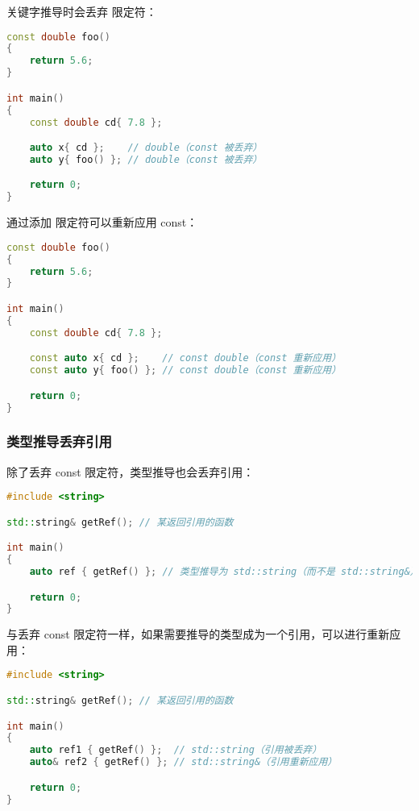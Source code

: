 \documentclass[../../LearnCpp.tex]{subfiles}
\begin{document}

 关键字推导时会丢弃  限定符：

\begin{lstlisting}[language=C++]
const double foo()
{
    return 5.6;
}

int main()
{
    const double cd{ 7.8 };

    auto x{ cd };    // double（const 被丢弃）
    auto y{ foo() }; // double（const 被丢弃）

    return 0;
}
\end{lstlisting}

通过添加  限定符可以重新应用 const：

\begin{lstlisting}[language=C++]
const double foo()
{
    return 5.6;
}

int main()
{
    const double cd{ 7.8 };

    const auto x{ cd };    // const double（const 重新应用）
    const auto y{ foo() }; // const double（const 重新应用）

    return 0;
}
\end{lstlisting}

\subsubsection*{类型推导丢弃引用}

除了丢弃 const 限定符，类型推导也会丢弃引用：

\begin{lstlisting}[language=C++]
#include <string>

std::string& getRef(); // 某返回引用的函数

int main()
{
    auto ref { getRef() }; // 类型推导为 std::string（而不是 std::string&）

    return 0;
}
\end{lstlisting}

与丢弃 const 限定符一样，如果需要推导的类型成为一个引用，可以进行重新应用：

\begin{lstlisting}[language=C++]
#include <string>

std::string& getRef(); // 某返回引用的函数

int main()
{
    auto ref1 { getRef() };  // std::string（引用被丢弃）
    auto& ref2 { getRef() }; // std::string&（引用重新应用）

    return 0;
}
\end{lstlisting}
\end{document}
